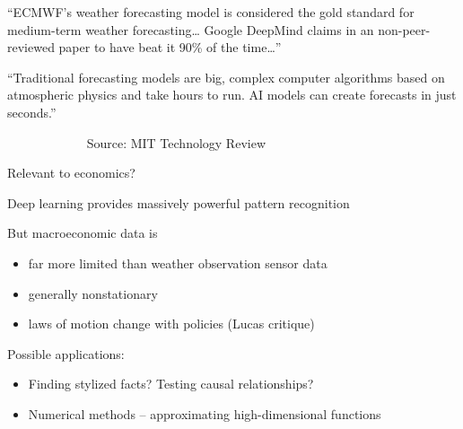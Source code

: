 \documentclass[
    xcolor={svgnames,dvipsnames},
    hyperref={colorlinks, citecolor=DeepPink4, linkcolor=DarkRed, urlcolor=DarkBlue}
    ]{beamer}  %
\newcommand{\1}{\mathbbm 1}
\begin{document}
\begin{frame}

    
    ``ECMWF's weather forecasting model is considered the gold standard for
        medium-term weather forecasting\ldots 
        Google DeepMind claims
        in an non-peer-reviewed paper to have beat it 90\% of the time\ldots''

    \vspace{0.5em}
    \vspace{0.5em}

    ``Traditional forecasting models are big, complex computer algorithms based
    on atmospheric physics and take hours to run. AI models can create forecasts
    in just seconds.'' 
    \vspace{0.5em}
    \vspace{0.5em}

    $\quad \qquad$$\quad \qquad$ Source: MIT Technology Review  

\end{frame}


\begin{frame}
    

    Relevant to economics?

    \vspace{0.5em}
    \pause
    Deep learning provides massively powerful pattern recognition

        \vspace{0.5em}
    But macroeconomic data is 

    \begin{itemize}
        \item far more limited than weather observation sensor data
        \vspace{0.5em}
        \item generally nonstationary
        \vspace{0.5em}
        \item laws of motion change with policies (Lucas critique)
    \end{itemize}

    \vspace{0.5em}

    Possible applications:

    \begin{itemize}
        \item Finding stylized facts? Testing causal relationships?
        \vspace{0.5em}
        \item Numerical methods -- approximating high-dimensional functions
    \end{itemize}

\end{frame}
\end{document}
